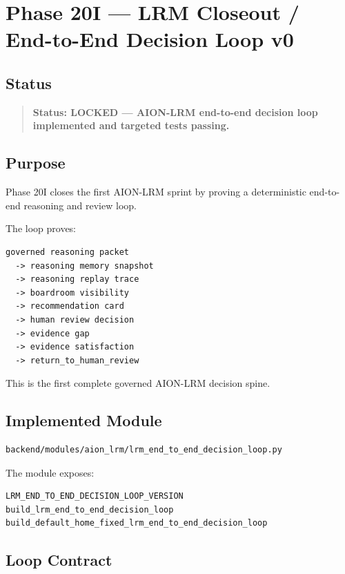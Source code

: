 \section{Phase 20I --- LRM Closeout / End-to-End Decision Loop v0}
\label{sec:phase20i-lrm-end-to-end-decision-loop-v0}

\subsection{Status}

\begin{quote}
\textbf{Status: LOCKED --- AION-LRM end-to-end decision loop implemented and targeted tests passing.}
\end{quote}

\subsection{Purpose}

Phase 20I closes the first AION-LRM sprint by proving a deterministic end-to-end reasoning and review loop.

The loop proves:

\begin{verbatim}
governed reasoning packet
  -> reasoning memory snapshot
  -> reasoning replay trace
  -> boardroom visibility
  -> recommendation card
  -> human review decision
  -> evidence gap
  -> evidence satisfaction
  -> return_to_human_review
\end{verbatim}

This is the first complete governed AION-LRM decision spine.

\subsection{Implemented Module}

\begin{verbatim}
backend/modules/aion_lrm/lrm_end_to_end_decision_loop.py
\end{verbatim}

The module exposes:

\begin{verbatim}
LRM_END_TO_END_DECISION_LOOP_VERSION
build_lrm_end_to_end_decision_loop
build_default_home_fixed_lrm_end_to_end_decision_loop
\end{verbatim}

\subsection{Loop Contract}

